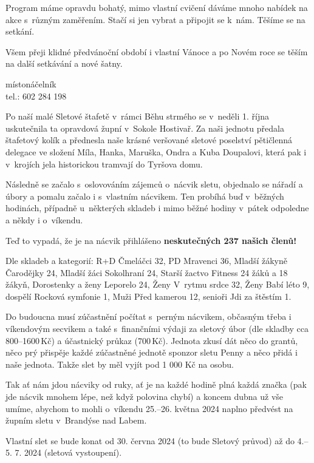 \documentclass[11pt]{article}
\begin{document}
Program máme opravdu bohatý, mimo vlastní cvičení dáváme mnoho nabídek na akce s~různým zaměřením. Stačí si jen vybrat a připojit se k~nám. Těšíme se na setkání.

Všem přeji klidné předvánoční období i vlastní Vánoce a po Novém roce se těším na další setkávání a nové šatny.

\signature{Jiří Novák (Jirkan)}{místonáčelník\\tel.: 602 284 198}

\vspace*{24pt}
\clearpage

Po naší malé Sletové štafetě v~rámci Běhu strmého se v~neděli 1. října uskutečnila ta opravdová župní v~Sokole Hostivař. Za naši jednotu předala štafetový kolík a přednesla naše krásné veršované sletové poselství pětičlenná delegace ve složení Míla, Hanka, Maruška, Ondra a Kuba Doupalovi, která pak i v~krojích jela historickou tramvají do Tyršova domu.

Následně se začalo s~oslovováním zájemců o~nácvik sletu, objednalo se nářadí a úbory a pomalu začalo i s~vlastním nácvikem. Ten probíhá buď v~běžných hodinách, případně u~některých skladeb i mimo běžné hodiny v~pátek odpoledne a někdy i o~víkendu.

Teď to vypadá, že je na nácvik přihlášeno \textbf{neskutečných 237 našich členů!}

Dle skladeb a kategorií: R+D Čmeláčci 32, PD Mravenci 36, Mladší žákyně Čarodějky 24, Mladší žáci Sokolhraní 24, Starší žactvo Fitness 24 žáků a 18 žákyň, Dorostenky a ženy Leporelo 24, Ženy V~rytmu srdce 32, Ženy Babí léto 9, dospělí Rocková symfonie 1, Muži Před kamerou 12, senioři Jdi za štěstím 1.

Do budoucna musí zúčastnění počítat s~perným nácvikem, občasným třeba i víkendovým secvikem a také s~finančními výdaji za sletový úbor (dle skladby cca 800–1600\,Kč) a účastnický průkaz (700\,Kč). Jednota zkusí dát něco do grantů, něco prý přispěje každé zúčastněné jednotě sponzor sletu Penny a něco přidá i naše jednota. Takže slet by měl vyjít pod 1 000 Kč na osobu.  

Tak ať nám jdou nácviky od ruky, ať je na každé hodině plná každá značka (pak jde nácvik mnohem lépe, než když polovina chybí) a koncem dubna už vše umíme, abychom to mohli o~víkendu 25.–26. května 2024 naplno předvést na župním sletu v~Brandýse nad Labem.

Vlastní slet se bude konat od 30. června 2024 (to bude Sletový průvod) až do 4.–5. 7. 2024 (sletová vystoupení).
\end{document}
